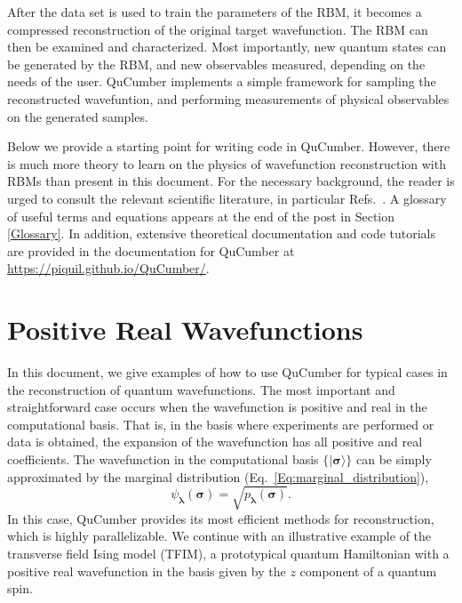 \documentclass[submission, Phys]{SciPost}
\begin{document}
After the data set is used to train the parameters of the RBM, it becomes a compressed reconstruction of the original target wavefunction.  The RBM can then be examined and characterized.  Most importantly, new quantum states can be generated by the RBM, and new observables measured, depending on the needs of the user.  QuCumber implements a simple framework for sampling the reconstructed wavefuntion, and performing measurements of physical observables on the generated samples.

Below we provide a starting point for writing code in QuCumber.  However, there is much more theory to learn on the physics of wavefunction reconstruction with RBMs than present in this document. For the necessary background, the reader is urged to consult the relevant scientific literature, in particular Refs.~\cite{Torlai2016thermo, torlai2018tomography}.  
A glossary of useful terms and equations appears at the end of the post in Section \ref{Glossary}.
In addition, extensive theoretical documentation and code tutorials are provided in the documentation for QuCumber at \url{https://piquil.github.io/QuCumber/}. 


\section{Positive Real Wavefunctions}

In this document, we give examples of how to use QuCumber for typical cases in the reconstruction of quantum wavefunctions.  
The most important and straightforward case occurs when the wavefunction is positive and real in the computational basis.  That is, in the basis where experiments are performed or data is obtained, the expansion of the wavefunction has all positive and real coefficients.  The wavefunction in the computational basis $\{ \vert\bm{\sigma}\rangle \}$ can be simply approximated by the marginal distribution (Eq.~\ref{Eq:marginal_distribution}), 
\begin{equation}
\psi_{\bm{\lambda}}(\bm{\sigma}) = \sqrt{p_{\bm{\lambda}} ( \bm{\sigma})}.  \label{PDwavef}
\end{equation}
In this case, QuCumber provides its most efficient methods for reconstruction, which is highly parallelizable.  
We continue with an illustrative example of the transverse field Ising model (TFIM), a prototypical quantum Hamiltonian with a positive real wavefunction in the basis given by the $z$ component of a quantum spin.

\end{document}
